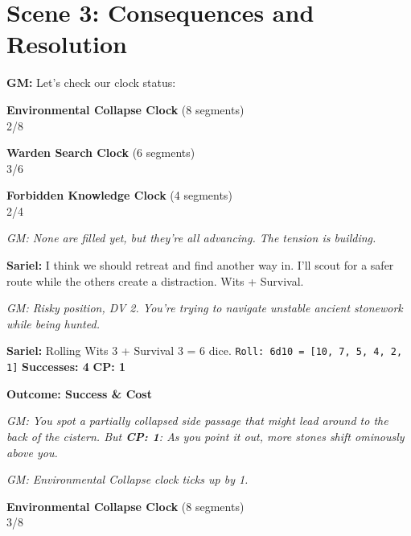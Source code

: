 \documentclass[11pt]{article}
\newcommand{\player}[1]{\textbf{#1:}}
\newcommand{\gm}[1]{\textit{GM: #1}}
\newcommand{\roll}[2]{\texttt{Roll: #1d10 = [#2]}}
\newcommand{\success}[1]{\textbf{Successes: #1}}
\newcommand{\cp}[1]{\textbf{CP: #1}}
\newcommand{\outcome}[1]{\textbf{Outcome: #1}}
\newcommand{\clocksegment}{\textbullet}
\begin{document}
\section*{Scene 3: Consequences and Resolution}

\player{GM} Let's check our clock status:

\begin{center}
\textbf{Environmental Collapse Clock} (8 segments)\\
\fbox{\textcolor{clockcolor}{\clocksegment\clocksegment}\clocksegment\clocksegment\clocksegment\clocksegment\clocksegment\clocksegment} 2/8
\end{center}

\begin{center}
\textbf{Warden Search Clock} (6 segments)\\
\fbox{\textcolor{clockcolor}{\clocksegment\clocksegment\clocksegment}\clocksegment\clocksegment\clocksegment} 3/6
\end{center}

\begin{center}
\textbf{Forbidden Knowledge Clock} (4 segments)\\
\fbox{\textcolor{clockcolor}{\clocksegment\clocksegment}\clocksegment\clocksegment} 2/4
\end{center}

\gm{None are filled yet, but they're all advancing. The tension is building.}

\player{Sariel} I think we should retreat and find another way in. I'll scout for a safer route while the others create a distraction. Wits + Survival.

\gm{Risky position, DV 2. You're trying to navigate unstable ancient stonework while being hunted.}

\player{Sariel} Rolling Wits 3 + Survival 3 = 6 dice. \roll{6}{10, 7, 5, 4, 2, 1} \success{4} \cp{1}

\outcome{Success \& Cost}

\gm{You spot a partially collapsed side passage that might lead around to the back of the cistern. But \cp{1}: As you point it out, more stones shift ominously above you.}

\gm{Environmental Collapse clock ticks up by 1.}

\begin{center}
\textbf{Environmental Collapse Clock} (8 segments)\\
\fbox{\textcolor{clockcolor}{\clocksegment\clocksegment\clocksegment}\clocksegment\clocksegment\clocksegment\clocksegment\clocksegment} 3/8
\end{center}
\end{document}
